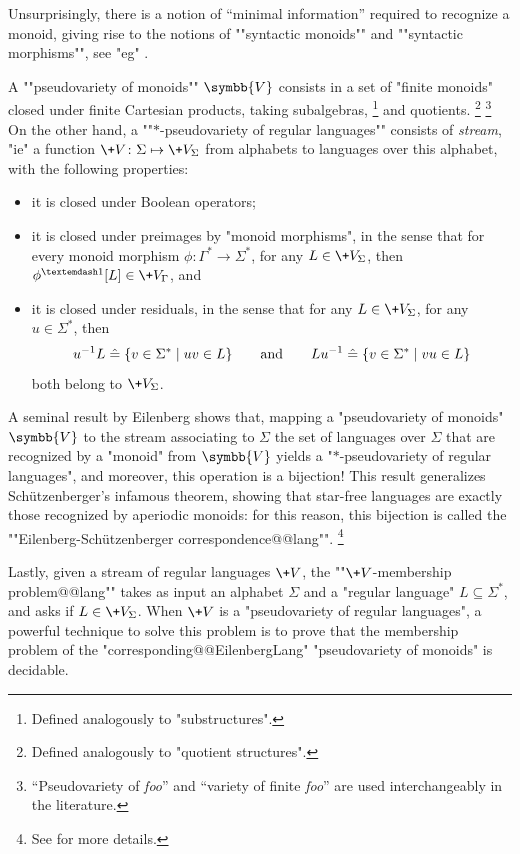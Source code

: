 Unsurprisingly, there is a notion of ``minimal information'' required to recognize a monoid,
giving rise to the notions of ""syntactic monoids"" and ""syntactic morphisms"",
see "eg" \cite[Theorem~1.7]{Bojanczyk2020MSO}.

A \AP""pseudovariety of monoids"" $\symbb{V}$%
consists in a set of "finite monoids" closed under finite Cartesian products,
taking subalgebras,%
\footnote{Defined analogously to "substructures".}
and quotients.%
\footnote{Defined analogously to "quotient structures".}%
\footnote{``Pseudovariety of \emph{foo}'' and ``variety of finite \emph{foo}''
are used interchangeably in the literature.}
On the other hand, a ""$\ast$-pseudovariety of regular languages""
consists of \emph{stream}, "ie" a function $\+V\colon \Sigma \mapsto \+V_{\Sigma}$ from alphabets to languages over this alphabet, with the following properties:
\begin{itemize}
	\item it is closed under Boolean operators;
	\item it is closed under preimages by "monoid morphisms", in the sense that
		for every monoid morphism $\phi\colon \Gamma^* \to \Sigma^*$, for any $L \in \+V_{\Sigma}$,
		then $\phi^{—1}[L] \in \+V_{\Gamma}$, and
	\item it is closed under residuals, in the sense that for any $L \in \+V_{\Sigma}$,
		for any $u\in\Sigma^*$, then
		\[
			u^{-1}L \mathrel{\hat{=}} \{v \in \Sigma^* \mid uv \in L\}
			\qquad\text{and}\qquad
			Lu^{-1} \mathrel{\hat{=}} \{v \in \Sigma^* \mid vu \in L\}
		\]
		both belong to $\+V_{\Sigma}$.
\end{itemize}
A seminal result by Eilenberg shows that, mapping a "pseudovariety of monoids" $\symbb{V}$
to the stream associating to $\Sigma$ the set of languages over $\Sigma$ that are recognized
by a "monoid" from $\symbb{V}$ yields a "$*$-pseudovariety of regular languages",
and moreover, this operation is a bijection!
This result generalizes Schützenberger's infamous theorem, showing that
star-free languages are exactly those recognized by aperiodic monoids:
for this reason, this bijection is called the \AP""Eilenberg-Schützenberger correspondence@@lang"".%
\footnote{See \cite[Theorem XIII.4.10, p.~228]{Pin2022MathematicalFoundations} for more details.}

Lastly, given a stream of regular languages $\+V$, the \AP""$\+V$-membership problem@@lang""
takes as input an alphabet $\Sigma$ and a "regular language" $L \subseteq \Sigma^*$,
and asks if $L \in \+V_{\Sigma}$. When $\+V$ is a "pseudovariety of regular languages",
a powerful technique to solve this problem is to prove that the membership problem
of the "corresponding@@EilenbergLang" "pseudovariety of monoids" is decidable.


